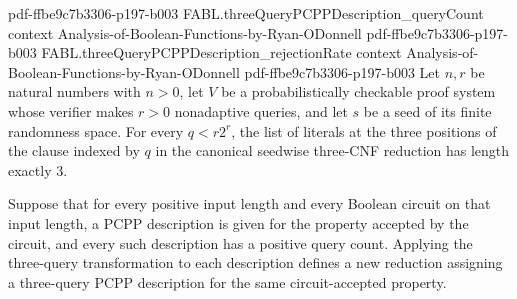 \begin{theorem}
{    pdf-ffbe9c7b3306-p197-b003}
\proofstep
  {FABL.threeQueryPCPPDescription_queryCount}
  {context}
  {Analysis-of-Boolean-Functions-by-Ryan-ODonnell}
  {pdf-ffbe9c7b3306-p197-b003}
\proofstep
  {FABL.threeQueryPCPPDescription_rejectionRate}
  {context}
  {Analysis-of-Boolean-Functions-by-Ryan-ODonnell}
  {pdf-ffbe9c7b3306-p197-b003}
Let $n,r$ be natural numbers with $n>0$, let $V$ be a probabilistically checkable proof
system whose verifier makes $r>0$ nonadaptive queries, and let $s$ be a seed of its
finite randomness space. For every $q<r2^r$, the list of literals at the three positions
of the clause indexed by $q$ in the canonical seedwise three-CNF reduction has length
exactly $3$.
\end{theorem}

\begin{definition}
\label{FABL.semanticPCPPReductionToThreeQueries}
\leanok
{}
Suppose that for every positive input length and every Boolean circuit on that input
length, a PCPP description is given for the property accepted by the circuit, and every
such description has a positive query count. Applying the three-query transformation to
each description defines a new reduction assigning a three-query PCPP description for
the same circuit-accepted property.
\end{definition}

